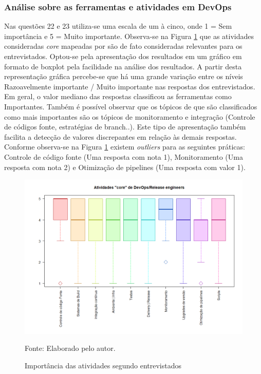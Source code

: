 \documentclass[twoside,english,brazilian]{UNISINOSartigo}
\newcommand{\source}[1]{\caption*{Fonte: {#1}} }
\begin{document}
\subsubsection{Análise sobre as ferramentas e atividades em DevOps}
Nas questões 22 e 23 utiliza-se uma escala de um à cinco, onde 1 = Sem importância e 5 = Muito importante.
Observa-se na Figura \ref{fig:importanciapratDevOps} que as atividades consideradas \textit{core} mapeadas por  são de fato consideradas relevantes para os entrevistados. Optou-se pela apresentação dos resultados em um gráfico em formato de boxplot pela facilidade na análise dos resultados. A partir desta representação gráfica percebe-se que há uma grande variação entre os níveis Razoavelmente importante / Muito importante nas respostas dos entrevistados. Em geral, o valor mediano das respostas classificou as ferramentas como Importantes. Também é possível observar que os tópicos de que são classificados como mais importantes são os tópicos de monitoramento e integração (Controle de códigos fonte, estratégias de branch..). 
Este tipo de apresentação também facilita a detecção de valores discrepantes em relação às demais respostas. Conforme observa-se na Figura \ref{fig:importanciapratDevOps} existem \textit{outliers} para as seguintes práticas: Controle de código fonte (Uma resposta com nota 1), Monitoramento (Uma resposta com nota 2) e Otimização de pipelines (Uma resposta com valor 1).

\begin{figure}[H]
    \centering
    \caption{Importância das atividades segundo entrevistados}
       \includegraphics[scale=.5]{imagens/Rplot.png}
        \source{Elaborado pelo autor.}
    \label{fig:importanciapratDevOps}
\end{figure}
\end{document}
